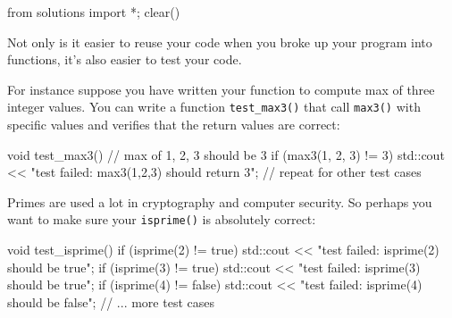 \begin{python0}
from solutions import *; clear()
\end{python0}

Not only is it easier to reuse your code when you broke up your program into functions, it's also easier to test your code.

For instance suppose you have written your function to compute max of three integer values. You can write a function \texttt{test\_max3()} that call \texttt{max3()} with specific values and verifies that the return values are correct:

\begin{consolethree}[escapeinside=||]
void test_max3()
{
    // max of 1, 2, 3 should be 3
    if (max3(1, 2, 3) != 3)
    {
        std::cout << "test failed: max3(1,2,3) should return 3\n";
    }
    // repeat for other test cases
}
\end{consolethree}

Primes are used a lot in cryptography and computer security. So perhaps you want to make sure your \texttt{isprime()} is absolutely correct:

\begin{consolethree}[escapeinside=||]
void test_isprime()
{
    if (isprime(2) != true)
    {
        std::cout << "test failed: isprime(2) should be true\n";
    }
    if (isprime(3) != true)
    {
        std::cout << "test failed: isprime(3) should be true\n";
    }
    if (isprime(4) != false)
    {
        std::cout << "test failed: isprime(4) should be false\n";
    }
    // ... more test cases
}
\end{consolethree}



